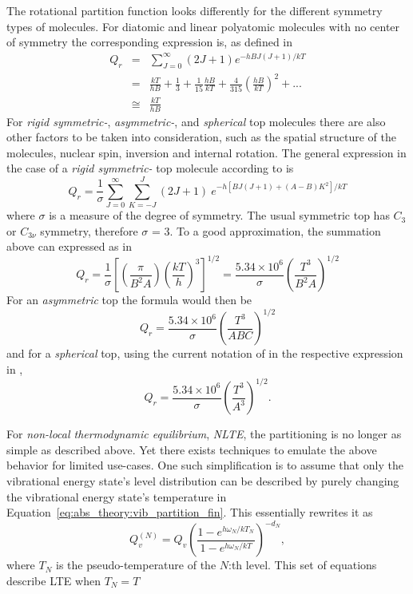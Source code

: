 The rotational partition function looks differently for the different
symmetry types of molecules.
For diatomic and linear  polyatomic molecules with no center of
symmetry the corresponding expression is, as defined in \citet{gordyandcook:70}
\begin{eqnarray}\label{eq:abs_theory:rot_partition}
Q_r & = & \sum_{J=0}^\infty (2J+1)e^{-hBJ(J+1)/kT}\nonumber\\
   & = & \frac{kT}{hB}+\frac{1}{3}+\frac{1}{15}\frac{hB}{kT}+\frac{4}{315}\left(\frac{hB}{kT}\right)^2+...\nonumber\\
   & \cong & \frac{kT}{hB}
\end{eqnarray}
For {\it{ rigid symmetric-}}, {\it{asymmetric-}}, and {\it{spherical}} top molecules there are also
other factors to be taken into consideration, such as the
spatial structure of the molecules, nuclear spin, inversion and
internal rotation. The general expression in the case of a 
{\it{ rigid symmetric-}} top molecule according to \citet{herzberg:45}
is
\begin{equation}\label{eq:abs_theory:rot_partition_symtop}
Q_r  =  \frac{1}{\sigma}\sum_{J=0}^\infty \sum_{K=-J}^{J}(2J+1)~e^{-h[BJ(J+1)+(A-B)K^2]/kT}
\end{equation}
where $\sigma$ is a measure of the degree of symmetry. The usual
symmetric top has $C_3$ or $C_{3\nu}$ symmetry, therefore $\sigma$ = 3. To a good
approximation, the summation above can expressed as in \citet{gordyandcook:70}
\begin{equation}\label{eq:abs_theory:rot_partition_top_appro}
Q_r  = 
\frac{1}{\sigma}\left[\left(\frac{\pi}{B^2A}\right)\left(\frac{kT}{h}\right)^3\right]^{1/2}=
\frac{5.34\times 10^6}{\sigma}\left(\frac{T^3}{B^{2}A}\right)^{1/2}
\end{equation}
For an  {\it{asymmetric}} top the formula would then be 
\begin{equation}\label{eq:abs_theory:rot_partition_asymtop}
Q_r = \frac{5.34\times 10^6}{\sigma}\left(\frac{T^3}{ABC}\right)^{1/2}
\end{equation}
and for a {\it{spherical}} top, using the current notation of
\citet{gordyandcook:70} in the respective expression in \citet{herzberg:45},
\begin{equation}\label{eq:abs_theory:rot_partition_sphetop}
Q_r = \frac{5.34\times 10^6}{\sigma}\left(\frac{T^3}{A^3}\right)^{1/2}.
\end{equation}

For \textit{non-local thermodynamic equilibrium}, \textit{NLTE}, the partitioning
is no longer as simple as described above.  Yet there exists techniques to emulate
the above behavior for limited use-cases.  One such simplification is to assume 
that only the vibrational energy state's level distribution can be described by
purely changing the vibrational energy state's temperature 
in Equation~\ref{eq:abs_theory:vib_partition_fin}.  This essentially rewrites
it as
\begin{equation}
Q_v^{(N)}=Q_v \left(\frac{1-e^{h\omega_N/kT_N}}{1-e^{h\omega_N/kT}}\right)^{-d_N},
\end{equation}
where $T_N$ is the pseudo-temperature of the $N$:th level.  This
set of equations describe LTE when $T_N=T$

